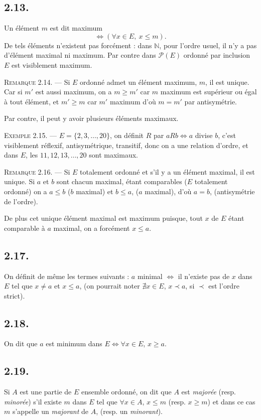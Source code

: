 \subsection*{2.13.}
Un élément $m$ est dit maximum
\[
\Leftrightarrow(\forall x\in E,\ x\le m).
\]
De tels éléments n'existent pas forcément : dans $\mathbb N$, pour l'ordre usuel, il n'y a pas d'élément maximal ni maximum. Par contre dans $\mathcal P(E)$ ordonné par inclusion $E$ est visiblement maximum.

\medskip\noindent\textsc{Remarque 2.14.} --- Si $E$ ordonné admet un élément maximum, $m$, il est unique. Car si $m'$ est aussi maximum, on a $m\ge m'$ car $m$ maximum est supérieur ou égal à tout élément, et $m'\ge m$ car $m'$ maximum d'où $m=m'$ par antisymétrie. \bookend

Par contre, il peut y avoir plusieurs éléments maximaux.

\medskip\noindent\textsc{Exemple 2.15.} --- $E=\{2,3,\ldots,20\}$, on définit $R$ par $aRb\Leftrightarrow a$ divise $b$, c'est visiblement réflexif, antisymétrique, transitif, donc on a une relation d'ordre, et dans $E$, les  $11,12,13,\ldots,20$ sont maximaux.

\medskip\noindent\textsc{Remarque 2.16.} --- Si $E$ totalement ordonné et s'il y a un élément maximal, il est unique. Si $a$ et $b$ sont chacun maximal, étant comparables ($E$ totalement ordonné) on a $a\le b$ ($b$ maximal) et $b\le a$, ($a$ maximal), d'où $a=b$, (antisymétrie de l'ordre). \bookend

De plus cet unique élément maximal est maximum puisque, tout $x$ de $E$ étant comparable à $a$ maximal, on a forcément $x\le a$.

\subsection*{2.17.}
On définit de même les termes suivants : $a$ minimal $\Leftrightarrow$ il n'existe pas de $x$ dans $E$ tel que $x\ne a$ et $x\le a$, (on pourrait noter $\nexists x\in E$, $x\prec a$, si $\prec$ est l'ordre strict).

\subsection*{2.18.}
On dit que $a$ est minimum dans $E\Leftrightarrow\forall x\in E$, $x\ge a$.

\subsection*{2.19.}
Si $A$ est une partie de $E$ ensemble ordonné, on dit que $A$ est \emph{majorée} (resp. \emph{minorée}) s'il existe $m$ dans $E$ tel que $\forall x\in A$, $x\le m$ (resp. $x\ge m$) et dans ce cas $m$ s'appelle un \emph{majorant} de $A$, (resp. un \emph{minorant}).

